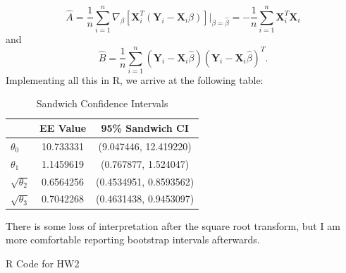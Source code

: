 \documentclass[11pt]{article}
\begin{document}
\begin{enumerate}
\begin{enumerate}
			\[
				\widehat{A} = \frac{1}{n} \sum_{i=1}^n \nabla_\beta [\bm{X}_i^T(\bm{Y}_i - \bm{X}_i\beta)]\big|_{\beta=\widehat{\beta}} = -\frac{1}{n} \sum_{i=1}^n \bm{X}_i^T\bm{X}_i
			\]
			and
			\[
				\widehat{B} = \frac{1}{n} \sum_{i=1}^n (\bm{Y}_i - \bm{X}_i\widehat{\beta})(\bm{Y}_i - \bm{X}_i\widehat{\beta})^T.
			\]
			Implementing all this in R, we arrive at the following table:
						\begin{table}[H]
			\centering			
			\begin{tabular}{l||c|c|}
			& EE Value & 95\% Sandwich CI \\
			\hline
			\hline
			$\theta_0$ & 10.733331&(9.047446, 12.419220)  \\
			\hline
			$\theta_1$ & 1.1459619& (0.767877, 1.524047) \\
			\hline
			$\sqrt{\theta_2}$ & 0.6564256& (0.4534951, 0.8593562)\\
			\hline
			$\sqrt{\theta_3}$ & 0.7042268 & (0.4631438, 0.9453097) \\
			\end{tabular}
			\caption{Sandwich Confidence Intervals}
			\end{table}
			There is some loss of interpretation after the square root transform, but I am more comfortable reporting bootstrap intervals afterwards. 
		\end{enumerate}
\end{enumerate}
\newpage
R Code for HW2
\end{document}
